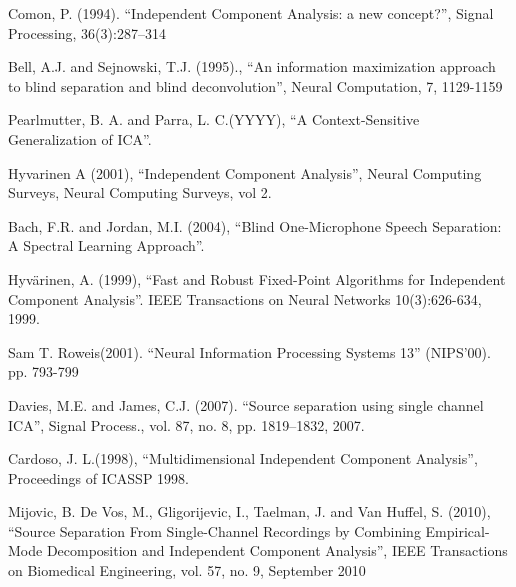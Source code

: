 \documentclass[11pt, oneside, a4paper]{article}
\begin{document}
\begin{thebibliography}{99}

 Comon, P. (1994). 
``Independent Component Analysis: a new concept?'', 
Signal Processing, 36(3):287–314

 Bell, A.J. and Sejnowski, T.J. (1995).,
``An information maximization approach to blind separation and blind deconvolution'', 
Neural Computation, 7, 1129-1159

Pearlmutter, B. A. and Parra, L. C.(YYYY),
``A Context-Sensitive Generalization of ICA''. 

Hyvarinen A (2001),
``Independent Component Analysis'',
Neural Computing Surveys, Neural Computing Surveys, vol 2.

 Bach, F.R. and Jordan, M.I. (2004),
``Blind One-Microphone Speech Separation: A Spectral Learning
  Approach''.

Hyvärinen, A. (1999),
``Fast and Robust Fixed-Point Algorithms for Independent Component
  Analysis''. 
IEEE Transactions on Neural Networks 10(3):626-634, 1999.

Sam T. Roweis(2001).
``Neural Information Processing Systems 13'' (NIPS'00).
pp. 793-799
  
Davies, M.E. and James, C.J. (2007).
``Source separation using single channel ICA'',
Signal Process., vol. 87, no. 8, pp. 1819–1832, 2007.

Cardoso, J. L.(1998),
``Multidimensional Independent Component Analysis'',
Proceedings of ICASSP 1998.

 Mijovic, B. De Vos, M.,  Gligorijevic, I.,
  Taelman, J. and Van Huffel, S. (2010),
``Source Separation From Single-Channel Recordings by Combining
  Empirical-Mode Decomposition and Independent Component Analysis'',
IEEE Transactions on Biomedical Engineering, vol. 57, no. 9, September 2010

\end{thebibliography}
\end{document}
